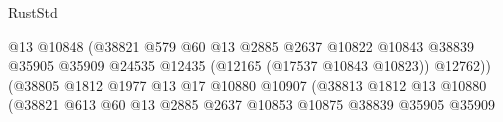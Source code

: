 \begin{lexlean}{RustStd}
\begin{coremodule}
                                                          @13
                                                          @10848
                                                          (@38821
                                                            @579
                                                            @60
                                                            @13
                                                            @2885
                                                            @2637
                                                            @10822
                                                            @10843
                                                            @38839
                                                            @35905
                                                            @35909
                                                            @24535
                                                            @12435
                                                            (@12165 (@17537 @10843 @10823))
                                                            @12762))
                                                        (@38805
                                                          @1812
                                                          @1977
                                                          @13
                                                          @17
                                                          @10880
                                                          @10907
                                                          (@38813
                                                            @1812
                                                            @13
                                                            @10880
                                                            (@38821
                                                              @613
                                                              @60
                                                              @13
                                                              @2885
                                                              @2637
                                                              @10853
                                                              @10875
                                                              @38839
                                                              @35905
                                                              @35909

\end{coremodule}
\end{lexlean}
